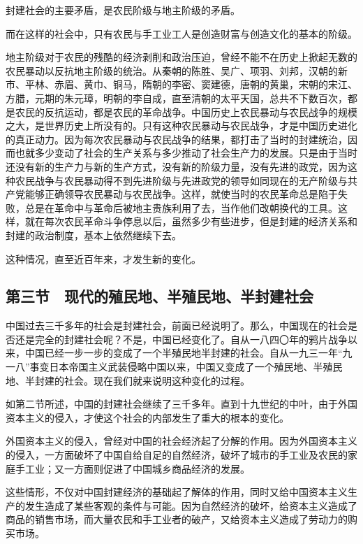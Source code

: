 封建社会的主要矛盾，是农民阶级与地主阶级的矛盾。

而在这样的社会中，只有农民与手工业工人是创造财富与创造文化的基本的阶级。

地主阶级对于农民的残酷的经济剥削和政治压迫，曾经不能不在历史上掀起无数的农民暴动以反抗地主阶级的统治。从秦朝的陈胜、吴广、项羽、刘邦，汉朝的新市、平林、赤眉、黄巾、铜马，隋朝的李密、窦建德，唐朝的黄巢，宋朝的宋江、方腊，元期的朱元璋，明朝的李自成，直至清朝的太平天国，总共不下数百次，都是农民的反抗运动，都是农民的革命战争。中国历史上农民暴动与农民战争的规模之大，是世界历史上所没有的。只有这种农民暴动与农民战争，才是中国历史进化的真正动力。因为每次农民暴动与农民战争的结果，都打击了当时的封建统治，因而也就多少变动了社会的生产关系与多少推动了社会生产力的发展。只是由于当时还没有新的生产力与新的生产方式，没有新的阶级力量，没有先进的政党，因为这种农民战争与农民暴动得不到先进阶级与先进政党的领导如同现在的无产阶级与共产党能够正确领导农民暴动与农民战争。这样，就使当时的农民革命总是陷于失败，总是在革命中与革命后被地主贵族利用了去，当作他们改朝换代的工具。这样，就在每次农民革命斗争停息以后，虽然多少有些进步，但是封建的经济关系和封建的政治制度，基本上依然继续下去。

这种情况，直至近百年来，才发生新的变化。

\subsection{第三节　现代的殖民地、半殖民地、半封建社会}

中国过去三千多年的社会是封建社会，前面已经说明了。那么，中国现在的社会是否还是完全的封建社会呢？不是，中国已经变化了。自从一八四〇年的鸦片战争以来，中国已经一步一步的变成了一个半殖民地半封建的社会。自从一九三一年“九一八”事变日本帝国主义武装侵略中国以来，中国又变成了一个殖民地、半殖民地、半封建的社会。现在我们就来说明这种变化的过程。

如第二节所述，中国的封建社会继续了三千多年。直到十九世纪的中叶，由于外国资本主义的侵入，才使这个社会的内部发生了重大的根本的变化。

外国资本主义的侵入，曾经对中国的社会经济起了分解的作用。因为外国资本主义的侵入，一方面破坏了中国自给自足的自然经济，破坏了城市的手工业及农民的家庭手工业；又一方面则促进了中国城乡商品经济的发展。

这些情形，不仅对中国封建经济的基础起了解体的作用，同时又给中国资本主义生产的发生造成了某些客观的条件与可能。因为自然经济的破坏，给资本主义造成了商品的销售市场，而大量农民和手工业者的破产，又给资本主义造成了劳动力的购买市场。

